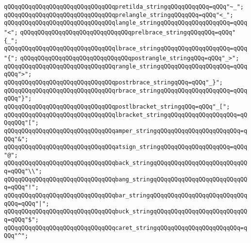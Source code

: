 \verb|qQQqqQQqqQQqqQQqqQQqqQQqqQQqqQQqpretilda_stringqQQqqQQqqQQq=qQQq"~_";|\newline
\newline
\verb|qQQqqQQqqQQqqQQqqQQqqQQqqQQqqQQqprelangle_stringqQQqqQQq=qQQq"<_";|\newline
\verb|qQQqqQQqqQQqqQQqqQQqqQQqqQQqqQQqlangle_stringqQQqqQQqqQQqqQQqqQQq=qQQq"<";|\newline
\newline
\verb|qQQqqQQqqQQqqQQqqQQqqQQqqQQqqQQqprelbrace_stringqQQqqQQq=qQQq"{_";|\newline
\verb|qQQqqQQqqQQqqQQqqQQqqQQqqQQqqQQqlbrace_stringqQQqqQQqqQQqqQQqqQQq=qQQq"{";|\newline
\newline
\verb|qQQqqQQqqQQqqQQqqQQqqQQqqQQqqQQqpostrangle_stringqQQq=qQQq"_>";|\newline
\verb|qQQqqQQqqQQqqQQqqQQqqQQqqQQqqQQqrangle_stringqQQqqQQqqQQqqQQqqQQq=qQQqqQQq">";|\newline
\newline
\verb|qQQqqQQqqQQqqQQqqQQqqQQqqQQqqQQqpostrbrace_stringqQQq=qQQq"_}";|\newline
\verb|qQQqqQQqqQQqqQQqqQQqqQQqqQQqqQQqrbrace_stringqQQqqQQqqQQqqQQqqQQq=qQQqqQQq"}";|\newline
\newline
\verb|qQQqqQQqqQQqqQQqqQQqqQQqqQQqqQQqpostlbracket_stringqQQq=qQQq"_[";|\newline
\verb|qQQqqQQqqQQqqQQqqQQqqQQqqQQqqQQqlbracket_stringqQQqqQQqqQQqqQQqqQQq=qQQqqQQq"[";|\newline
\newline
\verb|qQQqqQQqqQQqqQQqqQQqqQQqqQQqqQQqamper_stringqQQqqQQqqQQqqQQqqQQqqQQq=qQQq"&";|\newline
\verb|qQQqqQQqqQQqqQQqqQQqqQQqqQQqqQQqatsign_stringqQQqqQQqqQQqqQQqqQQq=qQQq"@";|\newline
\verb|qQQqqQQqqQQqqQQqqQQqqQQqqQQqqQQqback_stringqQQqqQQqqQQqqQQqqQQqqQQqqQQq=qQQq"\\";|\newline
\verb|qQQqqQQqqQQqqQQqqQQqqQQqqQQqqQQqbang_stringqQQqqQQqqQQqqQQqqQQqqQQqqQQq=qQQq"!";|\newline
\verb|qQQqqQQqqQQqqQQqqQQqqQQqqQQqqQQqbar_stringqQQqqQQqqQQqqQQqqQQqqQQqqQQqqQQq=qQQq"|\verb#|";#\newline
\verb|qQQqqQQqqQQqqQQqqQQqqQQqqQQqqQQqbuck_stringqQQqqQQqqQQqqQQqqQQqqQQqqQQq=qQQq"$";|\newline
\verb|qQQqqQQqqQQqqQQqqQQqqQQqqQQqqQQqcaret_stringqQQqqQQqqQQqqQQqqQQqqQQq=qQQq"^";|\newline
